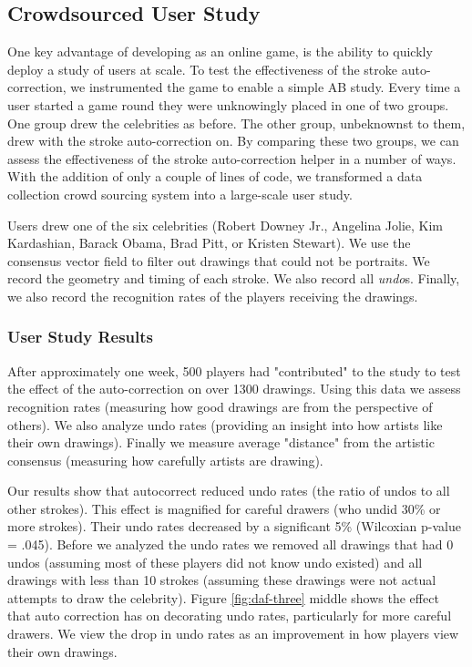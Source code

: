 \subsection {Crowdsourced User Study}

One key advantage of developing \daf as an online game, is the ability to quickly deploy a study of users at scale. To test the effectiveness of the stroke auto-correction, we instrumented the game to enable a simple AB study. Every time a user started a game round they were unknowingly placed in one of two groups. One group drew the celebrities as before. The other group, unbeknownst to them, drew with the stroke auto-correction on. By comparing these two groups, we can assess the effectiveness of the stroke auto-correction helper in a number of ways. With the addition of only a couple of lines of code, we transformed a data collection crowd sourcing system into a large-scale user study.

Users drew one of the six celebrities (Robert Downey Jr., Angelina Jolie, Kim Kardashian, Barack Obama, Brad Pitt, or Kristen Stewart). We use the consensus vector field to filter out drawings that could not be portraits. We record the geometry and timing of each stroke. We also record all {\em undo}s. Finally, we also record the recognition rates of the players receiving the drawings.

\subsubsection {User Study Results}

After approximately one week, 500 players had "contributed" to the study to test the effect of the auto-correction on over 1300 drawings. Using this data we assess recognition rates (measuring how good drawings are from the perspective of others). We also analyze undo rates (providing an insight into how artists like their own drawings). Finally we measure average "distance" from the artistic consensus (measuring how carefully artists are drawing).

Our results show that autocorrect reduced undo rates (the ratio of undos to all other strokes). This effect is magnified for careful drawers (who undid 30\% or more strokes). Their undo rates decreased by a significant 5\% (Wilcoxian p-value = .045).  Before we analyzed the undo rates we removed all drawings that had 0 undos (assuming most of these players did not know undo existed) and all drawings with less than 10 strokes (assuming these drawings were not actual attempts to draw the celebrity).  Figure \ref{fig:daf-three} middle shows the effect that auto correction has on decorating undo rates, particularly for more careful drawers. We view the drop in undo rates as an improvement in how players view their own drawings.

